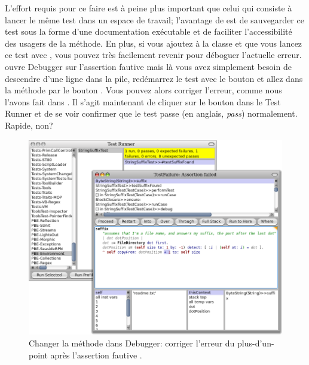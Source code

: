 \documentclass[a4paper,10pt,twoside]{book}
\begin{document}
L'effort requis pour ce faire est à peine plus important que celui
qui consiste à lancer le même test dans un espace de travail;
l'avantage de \sunit est de sauvegarder ce test sous la forme d'une
documentation exécutable et de faciliter l'accessibilité des usagers
de la méthode.
En plus, si vous ajoutez  à la classe
 et que vous lancez ce test avec \sunit, vous
pouvez très facilement revenir pour déboguer l'actuelle erreur.
\sunit ouvre Debugger sur l'assertion fautive mais là vous
avez simplement besoin de descendre d'une ligne dans la pile,
redémarrez le test avec le bouton  et allez
dans la méthode  par le bouton . Vous
pouvez alors corriger l'erreur, comme nous l'avons fait dans
.
Il s'agit maintenant de cliquer sur le bouton  dans
le \sunit Test Runner et de se voir confirmer que le test passe (en anglais, \emph{pass}) 
normalement. Rapide, non?

\begin{figure}[btp]
	\begin{center}
		\includegraphics[width=\textwidth]{fixOffByOne}
	\end{center}
	\caption{Changer la méthode  dans Debugger: corriger l'erreur du plus-d'un-point après l'assertion fautive \sunit.}
\end{figure} %
\end{document}
